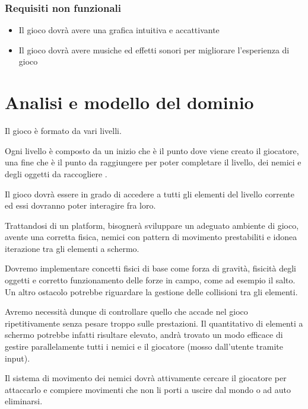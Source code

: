 \documentclass[a4paper,12pt]{report}
\begin{document}
\subsubsection{Requisiti non funzionali}
\begin{itemize}
	\item Il gioco dovrà avere una grafica intuitiva e accattivante
	\item Il gioco dovrà avere musiche ed effetti sonori per migliorare l'esperienza di gioco
\end{itemize}

\section{Analisi e modello del dominio}

Il gioco è formato da vari livelli.

Ogni livello è composto da un inizio che è il punto dove viene creato il giocatore, una fine che è il punto da raggiungere per poter completare il livello, dei nemici e degli oggetti da raccogliere .

Il gioco dovrà essere in grado di accedere a tutti gli elementi del livello corrente ed essi dovranno poter interagire fra loro.

Trattandosi di un platform, bisognerà sviluppare un adeguato ambiente di
gioco, avente una corretta fisica, nemici con pattern di movimento prestabiliti
e idonea iterazione tra gli elementi a schermo.

Dovremo implementare concetti fisici di base come forza di gravità, fisicità
degli oggetti e corretto funzionamento delle forze in campo, come ad esempio il salto.
Un altro ostacolo potrebbe riguardare la gestione delle collisioni tra gli elementi.

Avremo necessità dunque di controllare quello che accade nel gioco ripetitivamente senza pesare troppo sulle prestazioni. Il quantitativo di elementi a schermo potrebbe infatti risultare elevato, andrà trovato un modo efficace di gestire parallelamente tutti i nemici e il giocatore (mosso dall'utente tramite input). 

Il sistema di movimento dei nemici dovrà attivamente cercare il giocatore per attaccarlo e compiere movimenti che non li porti a uscire dal mondo o ad auto eliminarsi.
\end{document}
